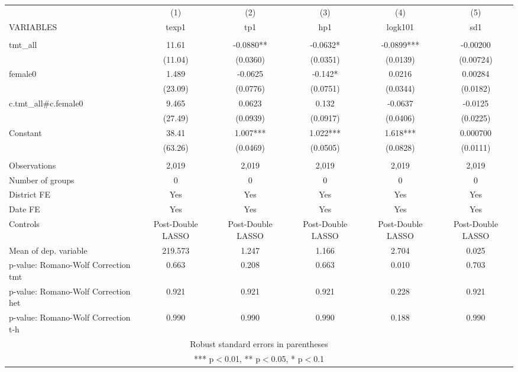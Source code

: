 \documentclass[]{article}
\begin{document}
\begin{tabular}{lccccc} \hline
 & (1) & (2) & (3) & (4) & (5) \\
VARIABLES & texp1 & tp1 & hp1 & logk101 & sd1 \\ \hline
 &  &  &  &  &  \\
tmt\_all & 11.61 & -0.0880** & -0.0632* & -0.0899*** & -0.00200 \\
 & (11.04) & (0.0360) & (0.0351) & (0.0139) & (0.00724) \\
female0 & 1.489 & -0.0625 & -0.142* & 0.0216 & 0.00284 \\
 & (23.09) & (0.0776) & (0.0751) & (0.0344) & (0.0182) \\
c.tmt\_all\#c.female0 & 9.465 & 0.0623 & 0.132 & -0.0637 & -0.0125 \\
 & (27.49) & (0.0939) & (0.0917) & (0.0406) & (0.0225) \\
Constant & 38.41 & 1.007*** & 1.022*** & 1.618*** & 0.000700 \\
 & (63.26) & (0.0469) & (0.0505) & (0.0828) & (0.0111) \\
 &  &  &  &  &  \\
Observations & 2,019 & 2,019 & 2,019 & 2,019 & 2,019 \\
Number of groups & 0 & 0 & 0 & 0 & 0 \\
District FE & Yes & Yes & Yes & Yes & Yes \\
Date FE & Yes & Yes & Yes & Yes & Yes \\
Controls & Post-Double LASSO & Post-Double LASSO & Post-Double LASSO & Post-Double LASSO & Post-Double LASSO \\
Mean of dep. variable & 219.573 & 1.247 & 1.166 & 2.704 & 0.025 \\
p-value: Romano-Wolf Correction tmt & 0.663 & 0.208 & 0.663 & 0.010 & 0.703 \\
p-value: Romano-Wolf Correction het & 0.921 & 0.921 & 0.921 & 0.228 & 0.921 \\
 p-value: Romano-Wolf Correction t-h & 0.990 & 0.990 & 0.990 & 0.188 & 0.990 \\ \hline
\multicolumn{6}{c}{ Robust standard errors in parentheses} \\
\multicolumn{6}{c}{ *** p$<$0.01, ** p$<$0.05, * p$<$0.1} \\
\end{tabular}
\end{document}
